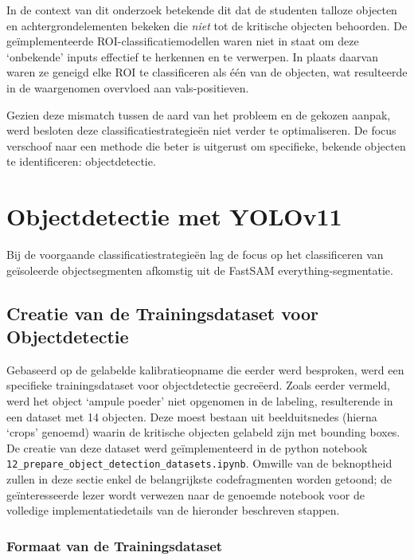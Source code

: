 In de context van dit onderzoek betekende dit dat de studenten talloze objecten en achtergrondelementen bekeken die \textit{niet} tot de kritische objecten behoorden.
De geïmplementeerde ROI-classificatiemodellen waren niet in staat om deze `onbekende' inputs effectief te herkennen en te verwerpen.
In plaats daarvan waren ze geneigd elke ROI te classificeren als één van de objecten, wat resulteerde in de waargenomen overvloed aan vals-positieven.

Gezien deze mismatch tussen de aard van het probleem en de gekozen aanpak, werd besloten deze classificatiestrategieën niet verder te optimaliseren.
De focus verschoof naar een methode die beter is uitgerust om specifieke, bekende objecten te identificeren: objectdetectie.

\section{Objectdetectie met YOLOv11} 

Bij de voorgaande classificatiestrategieën lag de focus op het classificeren van geïsoleerde objectsegmenten afkomstig uit de FastSAM everything-segmentatie.

\subsection{Creatie van de Trainingsdataset voor Objectdetectie}

Gebaseerd op de gelabelde kalibratieopname die eerder werd besproken, werd een specifieke trainingsdataset voor objectdetectie gecreëerd.
Zoals eerder vermeld, werd het object `ampule poeder' niet opgenomen in de labeling, resulterende in een dataset met 14 objecten.
Deze moest bestaan uit beelduitsnedes (hierna `crops' genoemd) waarin de kritische objecten gelabeld zijn met bounding boxes.
De creatie van deze dataset werd geïmplementeerd in de python notebook \texttt{12\_prepare\_object\_detection\_datasets.ipynb}.
Omwille van de beknoptheid zullen in deze sectie enkel de belangrijkste codefragmenten worden getoond; 
de geïnteresseerde lezer wordt verwezen naar de genoemde notebook voor de volledige implementatiedetails van de hieronder beschreven stappen.

\subsubsection{Formaat van de Trainingsdataset}

